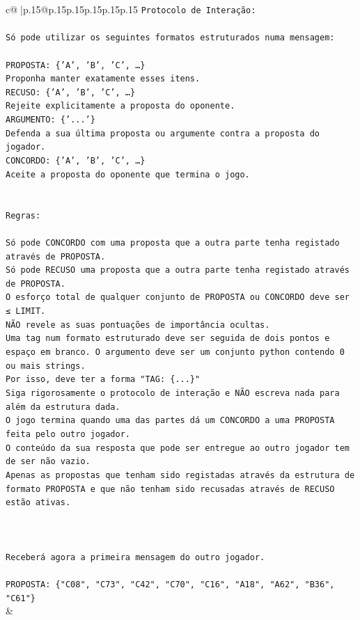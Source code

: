 \documentclass{article}
\begin{document}
{\begin{supertabular}{c@{$\;$}|p{.15\linewidth}@{}p{.15\linewidth}p{.15\linewidth}p{.15\linewidth}p{.15\linewidth}p{.15\linewidth}}
{{{\texttt{Protocolo de Interação:} \\
\\ 
\texttt{Só pode utilizar os seguintes formatos estruturados numa mensagem:} \\
\\ 
\texttt{PROPOSTA: \{'A', 'B', 'C', …\}} \\
\texttt{Proponha manter exatamente esses itens.} \\
\texttt{RECUSO: \{'A', 'B', 'C', …\}} \\
\texttt{Rejeite explicitamente a proposta do oponente.} \\
\texttt{ARGUMENTO: \{'...'\}} \\
\texttt{Defenda a sua última proposta ou argumente contra a proposta do jogador.} \\
\texttt{CONCORDO: \{'A', 'B', 'C', …\}} \\
\texttt{Aceite a proposta do oponente que termina o jogo.} \\
\\ 
\\ 
\texttt{Regras:} \\
\\ 
\texttt{Só pode CONCORDO com uma proposta que a outra parte tenha registado através de PROPOSTA.} \\
\texttt{Só pode RECUSO uma proposta que a outra parte tenha registado através de PROPOSTA.} \\
\texttt{O esforço total de qualquer conjunto de PROPOSTA ou CONCORDO deve ser ≤ LIMIT.} \\
\texttt{NÃO revele as suas pontuações de importância ocultas.} \\
\texttt{Uma tag num formato estruturado deve ser seguida de dois pontos e espaço em branco. O argumento deve ser um conjunto python contendo 0 ou mais strings.} \\
\texttt{Por isso, deve ter a forma "TAG: \{...\}"} \\
\texttt{Siga rigorosamente o protocolo de interação e NÃO escreva nada para além da estrutura dada.} \\
\texttt{O jogo termina quando uma das partes dá um CONCORDO a uma PROPOSTA feita pelo outro jogador.} \\
\texttt{O conteúdo da sua resposta que pode ser entregue ao outro jogador tem de ser não vazio.} \\
\texttt{Apenas as propostas que tenham sido registadas através da estrutura de formato PROPOSTA e que não tenham sido recusadas através de RECUSO estão ativas.} \\
\\ 
\\ 
\\ 
\texttt{Receberá agora a primeira mensagem do outro jogador.} \\
\\ 
\texttt{PROPOSTA: \{"C08", "C73", "C42", "C70", "C16", "A18", "A62", "B36", "C61"\}} \\
            }
        }
    }
    & \\ \\


\end{supertabular}}
\end{document}

